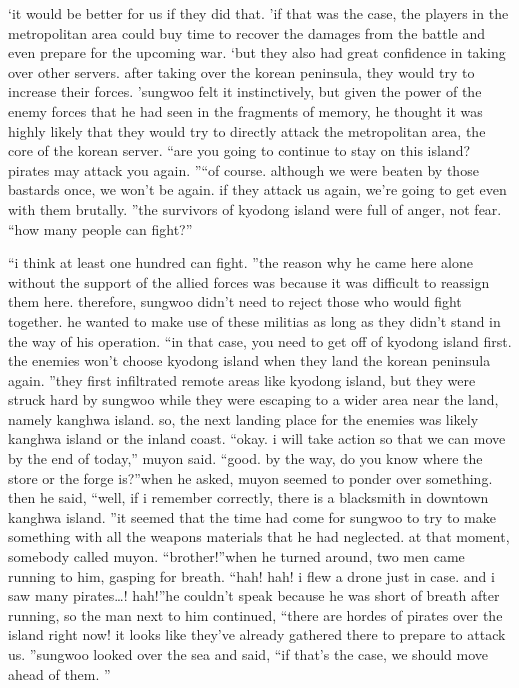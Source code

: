 ‘it would be better for us if they did that.
’if that was the case, the players in the metropolitan area could buy time to recover the damages from the battle and even prepare for the upcoming war.
‘but they also had great confidence in taking over other servers.
 after taking over the korean peninsula, they would try to increase their forces.
’sungwoo felt it instinctively, but given the power of the enemy forces that he had seen in the fragments of memory, he thought it was highly likely that they would try to directly attack the metropolitan area, the core of the korean server.
“are you going to continue to stay on this island? pirates may attack you again.
”“of course.
 although we were beaten by those bastards once, we won’t be again.
 if they attack us again, we’re going to get even with them brutally.
”the survivors of kyodong island were full of anger, not fear.
“how many people can fight?”

“i think at least one hundred can fight.
”the reason why he came here alone without the support of the allied forces was because it was difficult to reassign them here.
therefore, sungwoo didn’t need to reject those who would fight together.
 he wanted to make use of these militias as long as they didn’t stand in the way of his operation.
“in that case, you need to get off of kyodong island first.
 the enemies won’t choose kyodong island when they land the korean peninsula again.
”they first infiltrated remote areas like kyodong island, but they were struck hard by sungwoo while they were escaping to a wider area near the land, namely kanghwa island.
so, the next landing place for the enemies was likely kanghwa island or the inland coast.
“okay.
 i will take action so that we can move by the end of today,” muyon said.
“good.
 by the way, do you know where the store or the forge is?”when he asked, muyon seemed to ponder over something.
then he said, “well, if i remember correctly, there is a blacksmith in downtown kanghwa island.
”it seemed that the time had come for sungwoo to try to make something with all the weapons materials that he had neglected.
at that moment, somebody called muyon.
 “brother!”when he turned around, two men came running to him, gasping for breath.
“hah! hah! i flew a drone just in case.
 and i saw many pirates…! hah!”he couldn’t speak because he was short of breath after running, so the man next to him continued, “there are hordes of pirates over the island right now! it looks like they’ve already gathered there to prepare to attack us.
”sungwoo looked over the sea and said, “if that’s the case, we should move ahead of them.
”

 